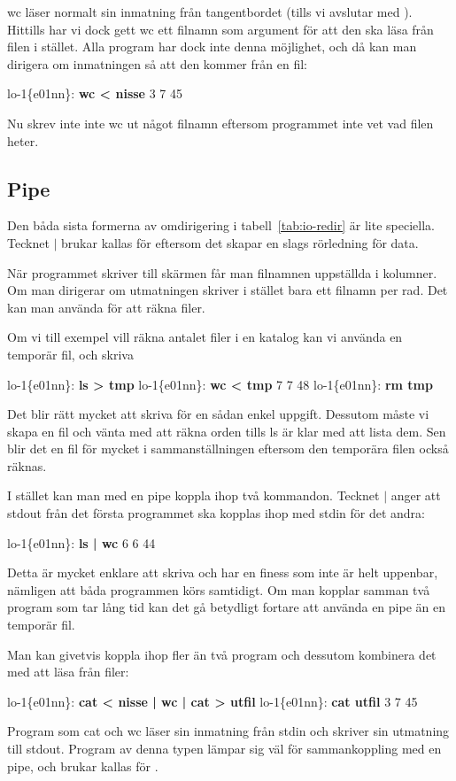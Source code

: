 \documentclass[a4paper,twocolumn]{book}
\begin{document}
wc läser normalt sin inmatning från tangentbordet (tills vi avslutar
med ). Hittills har vi dock gett wc ett filnamn som
argument för att den ska läsa från filen i stället. Alla program har
dock inte denna möjlighet, och då kan man dirigera om inmatningen så
att den kommer från en fil:
\begin{example}
lo-1\{e01nn\}: \textbf{wc < nisse}
       3       7      45
\end{example}
Nu skrev inte inte wc ut något filnamn eftersom programmet inte vet
vad filen heter.

\subsection{Pipe}

Den båda sista formerna av omdirigering i tabell~\ref{tab:io-redir} är lite
speciella. Tecknet $\mid$ brukar kallas för  eftersom det
skapar en slags rörledning för data.

När programmet  skriver till skärmen får man filnamnen
uppställda i kolumner. Om man dirigerar om utmatningen skriver
 i stället bara ett filnamn per rad. Det kan
man använda för att räkna filer.

Om vi till exempel vill räkna antalet filer i en katalog kan vi
använda en temporär fil, och skriva
\begin{example}
lo-1\{e01nn\}: \textbf{ls > tmp}
lo-1\{e01nn\}: \textbf{wc < tmp}
       7       7      48
lo-1\{e01nn\}: \textbf{rm tmp}
\end{example}
Det blir rätt mycket att skriva för en sådan enkel uppgift.
Dessutom måste vi skapa en fil och vänta med att räkna orden tills ls
är klar med att lista dem. Sen blir det en fil för mycket i
sammanställningen eftersom den temporära filen också räknas.

I stället kan man med en pipe koppla ihop två kommandon. Tecknet
$\mid$ anger att stdout från det första programmet ska kopplas ihop
med stdin för det andra:
\begin{example}
lo-1\{e01nn\}: \textbf{ls | wc}
       6       6      44
\end{example}
Detta är mycket enklare att skriva och har en finess som inte är helt
uppenbar, nämligen att båda programmen körs samtidigt. Om man kopplar
samman två program som tar lång tid kan det gå betydligt fortare att
använda en pipe än en temporär fil.

Man kan givetvis koppla ihop fler än två program och dessutom
kombinera det med att läsa från filer:
\begin{example}
lo-1\{e01nn\}: \textbf{cat < nisse | wc | cat > utfil}
lo-1\{e01nn\}: \textbf{cat utfil}
       3       7      45
\end{example} 
Program som cat och wc läser sin inmatning från stdin och skriver sin
utmatning till stdout. Program av denna typen lämpar sig väl för
sammankoppling med en pipe, och brukar kallas för .
\end{document}
